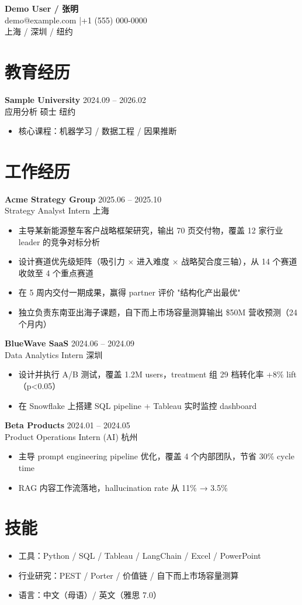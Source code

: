 \documentclass[10pt, a4paper]{article}
\newcommand{\expheader}[4]{%
    \vspace{3pt}%
    {\bfseries #1} \hfill {#3} \\
    {#2} \hfill {#4}%
    \vspace{3pt}%
}
\newcommand{\eduheader}[4]{%
    \vspace{3pt}%
    {\bfseries #1} \hfill {#3} \\
    {#2} \hfill {#4}%
    \vspace{3pt}%
}
\begin{document}
\begin{center}
    {\LARGE\bfseries Demo User / 张明} \\[6pt]
    demo@example.com \enspace|\enspace +1 (555) 000-0000 \\[3pt]
    上海 / 深圳 / 纽约
\end{center}

\vspace{0.2em}

\section{教育经历}

\eduheader
    {Sample University}
    {应用分析 硕士}
    {2024.09 -- 2026.02}
    {纽约}
\begin{itemize}
    \item 核心课程：机器学习 / 数据工程 / 因果推断
\end{itemize}

\section{工作经历}

\expheader
    {Acme Strategy Group}
    {Strategy Analyst Intern}
    {2025.06 -- 2025.10}
    {上海}
\begin{itemize}
    \item 主导某新能源整车客户战略框架研究，输出 70 页交付物，覆盖 12 家行业 leader 的竞争对标分析
    \item 设计赛道优先级矩阵（吸引力 × 进入难度 × 战略契合度三轴），从 14 个赛道收敛至 4 个重点赛道
    \item 在 5 周内交付一期成果，赢得 partner 评价 "结构化产出最优"
    \item 独立负责东南亚出海子课题，自下而上市场容量测算输出 \$50M 营收预测（24 个月内）
\end{itemize}

\expheader
    {BlueWave SaaS}
    {Data Analytics Intern}
    {2024.06 -- 2024.09}
    {深圳}
\begin{itemize}
    \item 设计并执行 A/B 测试，覆盖 1.2M users，treatment 组 29 档转化率 +8\% lift（p<0.05）
    \item 在 Snowflake 上搭建 SQL pipeline + Tableau 实时监控 dashboard
\end{itemize}

\expheader
    {Beta Products}
    {Product Operations Intern (AI)}
    {2024.01 -- 2024.05}
    {杭州}
\begin{itemize}
    \item 主导 prompt engineering pipeline 优化，覆盖 4 个内部团队，节省 30\% cycle time
    \item RAG 内容工作流落地，hallucination rate 从 11\% → 3.5\%
\end{itemize}

\section{技能}

\begin{itemize}
    \item 工具：Python / SQL / Tableau / LangChain / Excel / PowerPoint
    \item 行业研究：PEST / Porter / 价值链 / 自下而上市场容量测算
    \item 语言：中文（母语）/ 英文（雅思 7.0）
\end{itemize}
\end{document}
